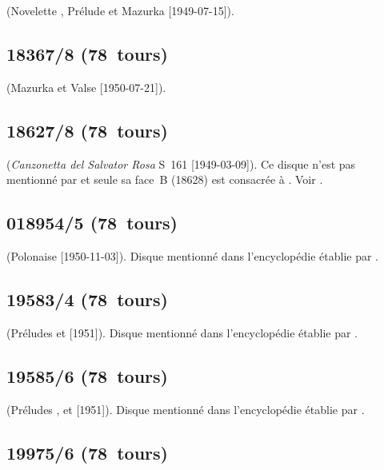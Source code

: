 \Liadov{} (Novelette , Prélude   et Mazurka
  [1949-07-15]).

\subsection{18367/8 (78~tours)}

\Chopin{} (Mazurka   et Valse  
[1950-07-21]).

\subsection{18627/8 (78~tours)}

\Liszt{} (\emph{Canzonetta del Salvator Rosa} S~161 
[1949-03-09]).
Ce disque n'est pas mentionné par \INikonovich{}
\citep[voir][]{Nikonovich11} et seule sa face~B (18628) est consacrée à
\VSofronitsky{}.
Voir \citet{Recordssu}.

\subsection{018954/5 (78~tours)}

\Scriabine{} (Polonaise  [1950-11-03]).
Disque mentionné dans l'encyclopédie établie par \citet[supplément~II,
p.~203]{CloughCuming}.

\subsection{19583/4 (78~tours)}

\Scriabine{} (Préludes   et   [1951]).
Disque mentionné dans l'encyclopédie établie par \citet[supplément~II,
p.~203]{CloughCuming}.

\subsection{19585/6 (78~tours)}

\Scriabine{} (Préludes  ,   et
  [1951]).
Disque mentionné dans l'encyclopédie établie par \citet[supplément~II,
p.~203]{CloughCuming}.

\subsection{19975/6 (78~tours)}


